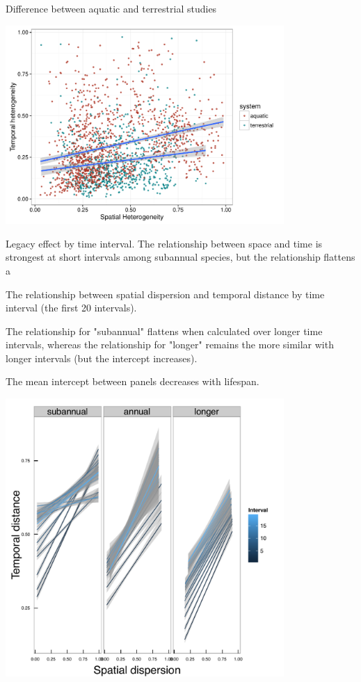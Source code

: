 \documentclass[11pt]{article}
\begin{document}
\newpage
Difference between aquatic and terrestrial studies

\includegraphics[width=400px]{aqterr}
\newpage


\newpage
Legacy effect by time interval. The relationship between space and time is strongest at short intervals among subannual species, but the relationship flattens a

The relationship between spatial dispersion and temporal distance by time interval (the first 20 intervals). 

The relationship for "subannual" flattens when calculated over longer time intervals, whereas the relationship for "longer" remains the more similar with longer intervals (but the intercept increases). 

The mean intercept between panels decreases with lifespan. 

\includegraphics[width=400px]{SpatialTemporalInterval}
\newpage
\end{document}
